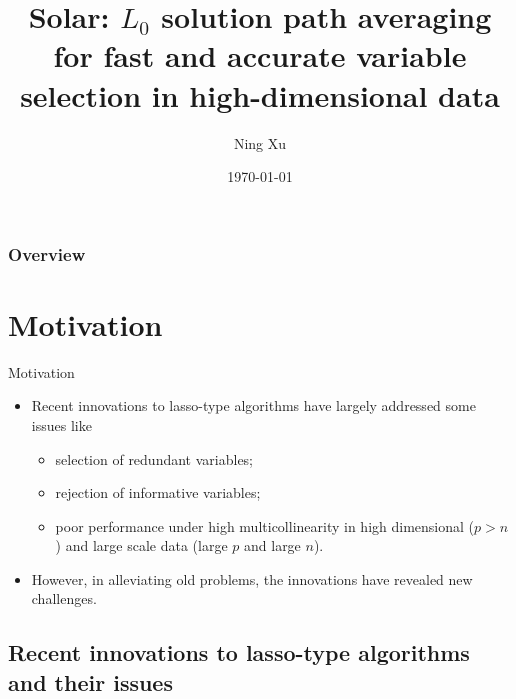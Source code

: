 \documentclass{beamer}
\title[Solar]{Solar: $L_0$ solution path averaging for fast and accurate variable selection in high-dimensional data}
\author{Ning Xu}
\date{\today}
\begin{document}
\begin{frame}
  \titlepage
\end{frame}

\begin{frame}
  \frametitle{Overview}
  \tableofcontents
\end{frame}



\section{Motivation}

\begin{frame}{Motivation}

  \begin{itemize}
    \item Recent innovations to lasso-type algorithms have largely addressed some issues like
    \begin{itemize}
      \item selection of redundant variables;
      \item rejection of informative variables; 
      \item poor performance under high multicollinearity in high dimensional ($p>n$) and large scale data (large $p$ and large $n$). 
    \end{itemize} 
    \item However, in alleviating old problems, the innovations have revealed new challenges.
  \end{itemize}

\end{frame}


\subsection{Recent innovations to lasso-type algorithms and their issues}
\end{document}

